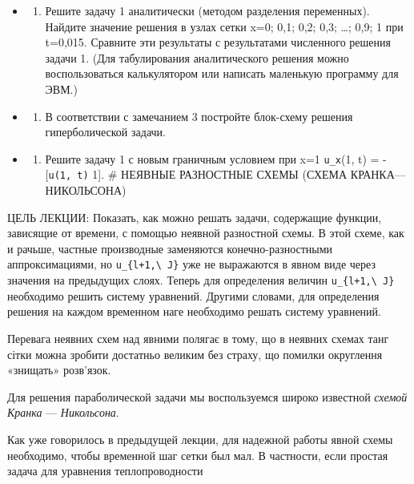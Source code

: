 \documentclass[
  ukrainian,
]{article}
\providecommand{\tightlist}{%
  \setlength{\itemsep}{0pt}\setlength{\parskip}{0pt}}
\begin{document}
\begin{itemize}
\tightlist
\item
  \begin{enumerate}
  \def\labelenumi{\arabic{enumi}.}
  \setcounter{enumi}{1}
  \tightlist
  \item
    Решите задачу 1 аналитически (методом разделения переменных).
    Найдите значение решения в узлах сетки x=0; 0,1; 0,2; 0,3; \ldots;
    0,9; 1 при t=0,015. Сравните эти результаты с результатами
    численного решения задачи 1. (Для табулирования аналитического
    решения можно воспользоваться калькулятором или написать маленькую
    программу для ЭВМ.)
  \end{enumerate}
\item
  \begin{enumerate}
  \def\labelenumi{\arabic{enumi}.}
  \setcounter{enumi}{2}
  \tightlist
  \item
    В соответствии с замечанием 3 постройте блок-схему решения
    гиперболической задачи.
  \end{enumerate}
\item
  \begin{enumerate}
  \def\labelenumi{\arabic{enumi}.}
  \setcounter{enumi}{3}
  \tightlist
  \item
    Решите задачу 1 с новым граничным условием при x=1 \texttt{u\_x}(1,
    t) = -{[}\texttt{u(1,\ t)} 1{]}. \# НЕЯВНЫЕ РАЗНОСТНЫЕ СХЕМЫ (СХЕМА
    КРАНКА---НИКОЛЬСОНА)
  \end{enumerate}
\end{itemize}

ЦЕЛЬ ЛЕКЦИИ: Показать, как можно решать задачи, содержащие функции,
зависящие от времени, с помощью неявной разностной схемы. В этой схеме,
как и рачьше, частные производные заменяются конечно-разностными
аппроксимациями, но \texttt{u\_\{l+1,\textbackslash{}\ J\}} уже не
выражаются в явном виде через значения на предыдущих слоях. Теперь для
определения величин \texttt{u\_\{l+1,\textbackslash{}\ J\}} необходимо
решить систему уравнений. Другими словами, для определения решения на
каждом временном наге необходимо решать систему уравнений.

Перевага неявних схем над явними полягає в тому, що в неявних схемах
танг сітки можна зробити достатньо великим без страху, що помилки
округлення «знищать» розв'язок.

Для решения параболической задачи мы воспользуемся широко известной
\emph{схемой Кранка} --- \emph{Никольсона}.

Как уже говорилось в предыдущей лекции, для надежной работы явной схемы
необходимо, чтобы временной шаг сетки был мал. В частности, если простая
задача для уравнения теплопроводности
\end{document}

